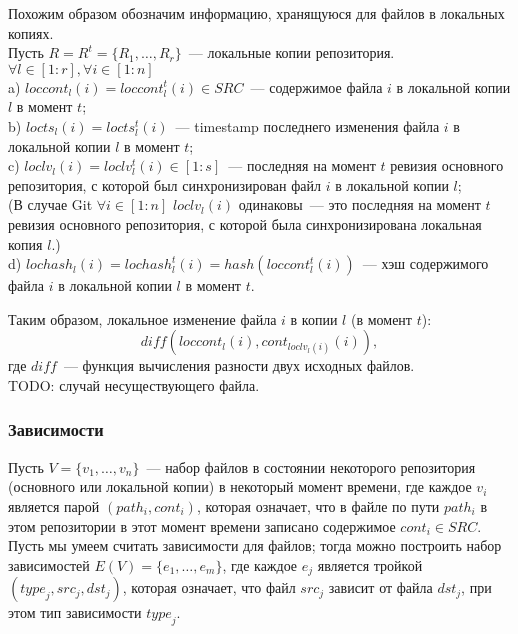 Похожим образом обозначим информацию, хранящуюся для файлов в локальных копиях.\\
Пусть $R = R^t = \{R_1, \dots, R_r\}$~--- локальные копии репозитория.\\
$\forall l \in [1:r], \forall i \in [1:n]$\\
\indent a) $loccont_l(i) = loccont_l^t(i) \in SRC$~--- содержимое файла $i$ в локальной копии $l$ в момент $t$;\\
\indent b) $locts_l(i) = locts_l^t(i)$~--- timestamp последнего изменения файла $i$ в локальной копии $l$ в момент $t$;\\
\indent c) $loclv_l(i) = loclv_l^t(i) \in {[1:s]}$~--- последняя на момент $t$ ревизия основного репозитория, с которой был синхронизирован файл $i$ в локальной копии $l$;\\
(В случае Git $\forall i \in [1:n]$ $loclv_l(i)$ одинаковы~--- это последняя на момент $t$ ревизия основного репозитория, с которой была синхронизирована локальная копия $l$.)\\
\indent d) $lochash_l(i) = lochash_l^t(i) = hash(loccont_l^t(i)) $~--- хэш содержимого файла $i$ в локальной копии $l$ в момент $t$.

Таким образом, локальное изменение файла $i$ в копии $l$ (в момент $t$): $$\mathit{diff}(loccont_l(i), cont_{loclv_l(i)}(i)),$$ где $\mathit{diff}$~--- функция вычисления разности двух исходных файлов.\\
TODO: случай несуществующего файла.

\subsubsection{Зависимости}

Пусть $V = \{v_1, \dots, v_n\}$~--- набор файлов в состоянии некоторого репозитория (основного или локальной копии) в некоторый момент времени, где каждое $v_i$ является парой $(path_i, cont_i)$, которая означает, что в файле по пути $path_i$ в этом репозитории в этот момент времени записано содержимое $cont_i \in SRC$. Пусть мы умеем считать зависимости для файлов; тогда можно построить набор зависимостей $E(V) = \{e_1, \dots, e_m\}$, где каждое $e_j$ является тройкой $(\textit{type}_j, \textit{src}_j, \textit{dst}_j)$, которая означает, что файл $\textit{src}_j$ зависит от файла $\textit{dst}_j$, при этом тип зависимости $\textit{type}_j$.\\

